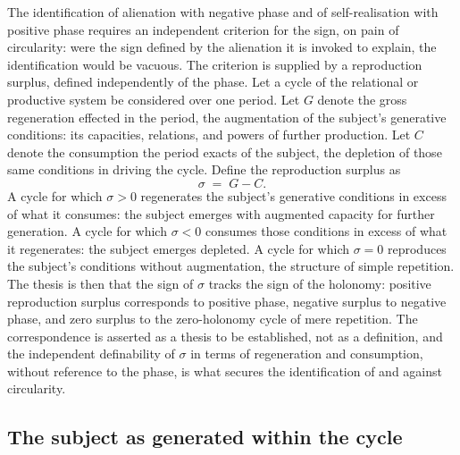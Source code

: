 The identification of alienation with negative phase and of self-realisation with positive phase requires an independent criterion for the sign, on pain of circularity: were the sign defined by the alienation it is invoked to explain, the identification would be vacuous. The criterion is supplied by a reproduction surplus, defined independently of the phase. Let a cycle of the relational or productive system be considered over one period. Let $G$ denote the gross regeneration effected in the period, the augmentation of the subject's generative conditions: its capacities, relations, and powers of further production. Let $C$ denote the consumption the period exacts of the subject, the depletion of those same conditions in driving the cycle. Define the reproduction surplus as
\[
\sigma \;=\; G - C .
\]
A cycle for which $\sigma > 0$ regenerates the subject's generative conditions in excess of what it consumes: the subject emerges with augmented capacity for further generation. A cycle for which $\sigma < 0$ consumes those conditions in excess of what it regenerates: the subject emerges depleted. A cycle for which $\sigma = 0$ reproduces the subject's conditions without augmentation, the structure of simple repetition. The thesis is then that the sign of $\sigma$ tracks the sign of the holonomy: positive reproduction surplus corresponds to positive phase, negative surplus to negative phase, and zero surplus to the zero-holonomy cycle of mere repetition. The correspondence is asserted as a thesis to be established, not as a definition, and the independent definability of $\sigma$ in terms of regeneration and consumption, without reference to the phase, is what secures the identification of  and  against circularity.

\subsection{The subject as generated within the cycle}
\label{p10:sec:subject-in-cycle}


